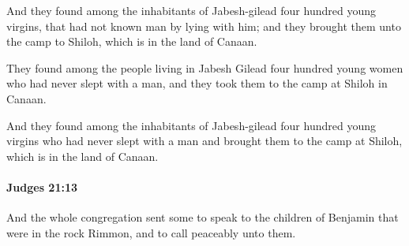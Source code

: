 			\begin{versebox}
					\item[BHS] 
					\item[ASV] And they found among the inhabitants of Jabesh-gilead four hundred young virgins, that had not known man by lying with him; and they brought them unto the camp to Shiloh, which is in the land of Canaan.
					\item[NIV] They found among the people living in Jabesh Gilead four hundred young women who had never slept with a man, and they took them to the camp at Shiloh in Canaan.
					\item[NRSV] And they found among the inhabitants of Jabesh-gilead four hundred young virgins who had never slept with a man and brought them to the camp at Shiloh, which is in the land of Canaan.
			\end{versebox}

		\paragraph{Judges 21:13} %
			\label{JUDGES-21-13}

			And the whole congregation sent some to speak to the children of Benjamin that were in the rock Rimmon, and to call peaceably unto them.

